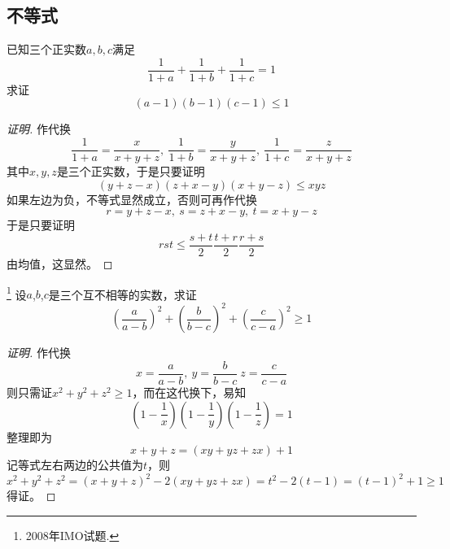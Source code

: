 \subsection{不等式}
\label{sec:exercise-inequality}


\begin{exercise}
  已知三个正实数$a,b,c$满足
  \begin{equation*}
    \frac{1}{1+a} + \frac{1}{1+b} + \frac{1}{1+c} = 1
  \end{equation*}
  求证
  \begin{equation*}
    (a-1)(b-1)(c-1) \leqslant 1
  \end{equation*}
\end{exercise}

\begin{proof}[证明]
  作代换
  \begin{equation*}
    \frac{1}{1+a} = \frac{x}{x+y+z}, \  \frac{1}{1+b} = \frac{y}{x+y+z}, \  \frac{1}{1+c} = \frac{z}{x+y+z}
  \end{equation*}
  其中$x,y,z$是三个正实数，于是只要证明
  \begin{equation*}
    (y+z-x)(z+x-y)(x+y-z) \leqslant xyz
  \end{equation*}
  如果左边为负，不等式显然成立，否则可再作代换
  \begin{equation*}
    r = y+z-x, \  s = z+x-y, \  t = x+y-z
  \end{equation*}
  于是只要证明
  \begin{equation*}
    rst \leqslant \frac{s+t}{2} \frac{t+r}{2} \frac{r+s}{2}
  \end{equation*}
  由均值，这显然。
\end{proof}

\begin{exercise}\footnote{2008年IMO试题.}
  设$a$,$b$,$c$是三个互不相等的实数，求证
  \[ \left( \frac{a}{a-b} \right)^2 + \left( \frac{b}{b-c} \right)^2 + \left( \frac{c}{c-a} \right)^2 \geqslant 1 \]
\end{exercise}

\begin{proof}[证明]
  作代换
  \[ x=\frac{a}{a-b}, \  y=\frac{b}{b-c} \  z=\frac{c}{c-a} \]
  则只需证$x^2+y^2+z^2 \geqslant 1$，而在这代换下，易知
  \[ \left( 1-\frac{1}{x} \right) \left( 1-\frac{1}{y} \right) \left( 1-\frac{1}{z} \right) = 1 \]
  整理即为
  \[ x+y+z = (xy+yz+zx)+1 \]
  记等式左右两边的公共值为$t$，则
    \[ x^2+y^2+z^2 = (x+y+z)^2-2(xy+yz+zx) = t^2-2(t-1)=(t-1)^2+1 \geqslant 1 \]
  得证。
\end{proof}

